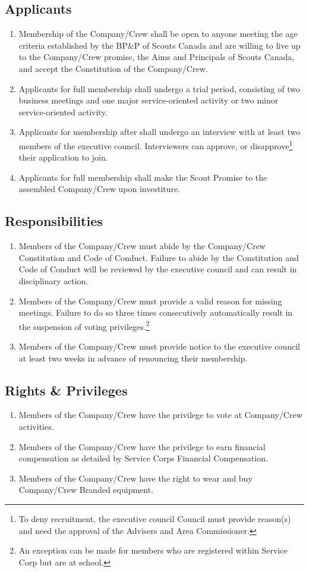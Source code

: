 \subsection{Applicants}
\begin{enumerate}
	\item Membership of the Company/Crew shall be open to anyone meeting the age criteria established by the BP\&P of Scouts Canada and are willing to live up to the Company/Crew promise, the Aims and Principals of Scouts Canada, and accept the Constitution of the Company/Crew. 
	\item Applicants for full membership shall undergo a trial period, consisting of two business meetings and one major service-oriented activity or two minor service-oriented activity.
	\item Applicants for membership after shall undergo an interview with at least two members of the executive council.
	Interviewers can approve, or disapprove\footnote{To deny recruitment, the executive council Council must provide reason(s) and need the approval of the Advisers and Area Commissioner.} their application to join.
	\item Applicants for full membership shall make the Scout Promise to the assembled Company/Crew upon investiture. 
\end{enumerate}
\subsection{Responsibilities}
\begin{enumerate}
	\item Members of the Company/Crew must abide by the Company/Crew Constitution and Code of Conduct.
	Failure to abide by the Constitution and Code of Conduct will be reviewed by the executive council and can result in disciplinary action.
	\item Members of the Company/Crew must provide a valid reason for missing meetings.
	Failure to do so three times consecutively automatically result in the suspension of voting privileges.\footnote{An exception can be made for members who are registered within Service Corp but are at school.}
	\item Members of the Company/Crew must provide notice to the executive council at least two weeks in advance of renouncing their membership.
\end{enumerate}
\subsection{Rights \& Privileges}
\begin{enumerate}
	\item Members of the Company/Crew have the privilege to vote at Company/Crew activities.
	\item Members of the Company/Crew have the privilege to earn financial compensation as detailed by Service Corps Financial Compensation.
	\item Members of the Company/Crew have the right to wear and buy Company/Crew Branded equipment.
\end{enumerate}